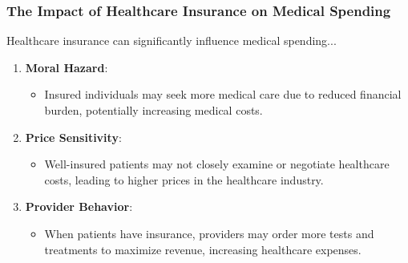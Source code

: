 \documentclass[notes,10pt, aspectratio=169]{beamer}
\begin{document}
\begin{frame}
\frametitle{The Impact of Healthcare Insurance on Medical Spending}
Healthcare insurance can significantly influence medical spending...\vspace{1em}

\begin{enumerate}
  \item \textbf{Moral Hazard}:
    \begin{itemize}
      \item Insured individuals may seek more medical care due to reduced financial burden, potentially increasing medical costs.\vspace{1em}
    \end{itemize}

  \item \textbf{Price Sensitivity}:
    \begin{itemize}
      \item Well-insured patients may not closely examine or negotiate healthcare costs, leading to higher prices in the healthcare industry.\vspace{1em}
    \end{itemize}

  \item \textbf{Provider Behavior}:
    \begin{itemize}
      \item When patients have insurance, providers may order more tests and treatments to maximize revenue, increasing healthcare expenses.\vspace{1em}
    \end{itemize}

\end{enumerate}
\end{frame}
\end{document}
